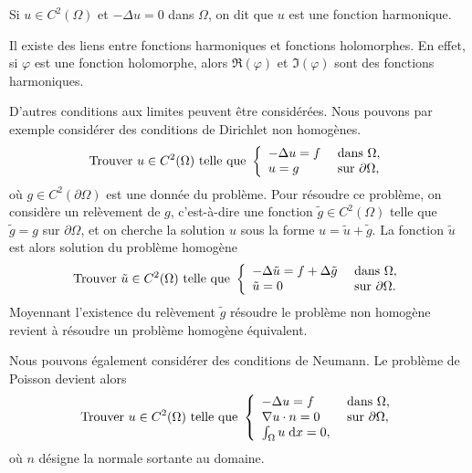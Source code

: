 \documentclass[12pt,a4paper,twoside]{article}
\begin{document}


\begin{definition}
  Si $u \in C^2(\Omega)$ et $- \Delta u = 0$ dans $\Omega$,
  on dit que $u$ est une fonction harmonique.
\end{definition}

Il existe des liens entre fonctions harmoniques et fonctions holomorphes.
En effet, si $\varphi$ est une fonction holomorphe,
alors $\Re(\varphi)$ et $\Im(\varphi)$ sont des fonctions harmoniques.


D'autres conditions aux limites peuvent \^etre consid\'er\'ees.
Nous pouvons par exemple consid\'erer des conditions de Dirichlet 
non homog\`enes.
\begin{equation*}
  \text{Trouver $u \in C^2(\Omega)$ telle que  }
  \left\{
    \begin{array}{l l}
      - \Delta u = f &\text{ dans } \Omega ,
      \\
      u = g &\text{ sur } \partial \Omega ,
    \end{array}
  \right.
\end{equation*}
o\`u $g \in C^2(\partial \Omega)$ est une donn\'ee du probl\`eme.
Pour r\'esoudre ce probl\`eme, on consid\`ere un rel\`evement de $g$,
c'est-\`a-dire une fonction $\tilde{g} \in C^2(\Omega)$ telle que
$\tilde{g} = g$ sur $\partial \Omega$,
et on cherche la solution $u$ sous la forme
$u = \tilde{u} + \tilde{g}$.
La fonction $\tilde{u}$ est alors solution du probl\`eme
homog\`ene
\begin{equation*}
  \text{Trouver $\tilde{u} \in C^2(\Omega)$ telle que  }
  \left\{
    \begin{array}{l l}
      - \Delta \tilde{u} = f + \Delta \tilde{g} &\text{ dans } \Omega ,
      \\
      \tilde{u} = 0 &\text{ sur } \partial \Omega .
    \end{array}
  \right.
\end{equation*}
Moyennant l'existence du rel\`evement $\tilde{g}$
r\'esoudre le probl\`eme non homog\`ene revient \`a 
r\'esoudre un probl\`eme homog\`ene \'equivalent.


Nous pouvons \'egalement consid\'erer des conditions
de Neumann. Le probl\`eme de Poisson devient alors
\begin{align}
  \label{eq:ell_Neu}
  \text{Trouver $u \in C^2(\Omega)$ telle que  }
  \left\{
    \begin{array}{l l}
      - \Delta u = f &\text{ dans } \Omega ,
      \\
      \nabla u \cdot n = 0 &\text{ sur } \partial \Omega ,
      \\
      \int_{\Omega} u \;\mathrm{d} x = 0 ,
    \end{array}
  \right.
\end{align}
o\`u $n$ d\'esigne la normale sortante au domaine.
\end{document}
